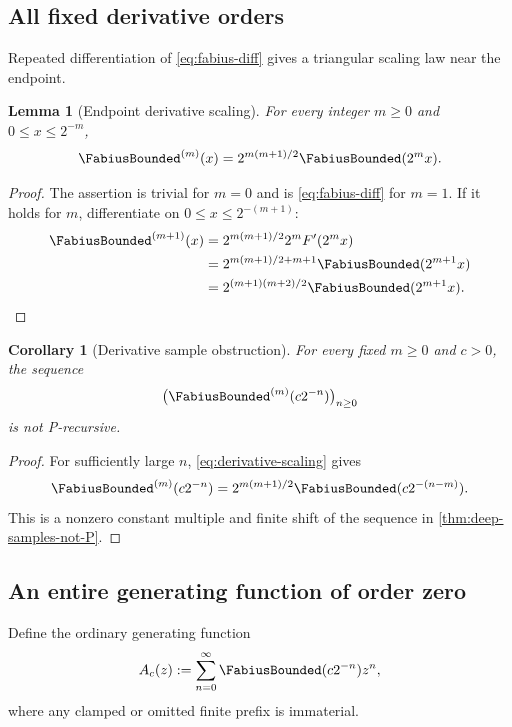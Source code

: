 \documentclass[11pt]{article}
\numberwithin{equation}{section}
\newtheorem{lemma}[theorem]{Lemma}
\newtheorem{corollary}[theorem]{Corollary}
\theoremstyle{definition}
\theoremstyle{remark}
\begin{document}
\subsection{All fixed derivative orders}

Repeated differentiation of \eqref{eq:fabius-diff} gives a triangular scaling
law near the endpoint.

\begin{lemma}[Endpoint derivative scaling]
\label{lem:derivative-scaling}
For every integer $m\ge0$ and $0\le x\le2^{-m}$,
\begin{equation}
 \FabiusBounded^{(m)}(x)=2^{m(m+1)/2}\FabiusBounded(2^mx).
 \label{eq:derivative-scaling}
\end{equation}
\end{lemma}
\begin{proof}
The assertion is trivial for $m=0$ and is \eqref{eq:fabius-diff} for $m=1$.
If it holds for $m$, differentiate on $0\le x\le2^{-(m+1)}$:
\begin{align*}
 \FabiusBounded^{(m+1)}(x)
 &=2^{m(m+1)/2}2^mF'(2^mx)\\
 &=2^{m(m+1)/2+m+1}\FabiusBounded(2^{m+1}x)\\
 &=2^{(m+1)(m+2)/2}\FabiusBounded(2^{m+1}x).
\end{align*}
\end{proof}

\begin{corollary}[Derivative sample obstruction]
\label{cor:derivative-samples-not-P}
For every fixed $m\ge0$ and $c>0$, the sequence
\begin{equation}
 \bigl(\FabiusBounded^{(m)}(c2^{-n})\bigr)_{n\ge0}
 \label{eq:derivative-sample-sequence}
\end{equation}
is not P-recursive.
\end{corollary}
\begin{proof}
For sufficiently large $n$, \eqref{eq:derivative-scaling} gives
\[
 \FabiusBounded^{(m)}(c2^{-n})
 =2^{m(m+1)/2}\FabiusBounded(c2^{-(n-m)}).
\]
This is a nonzero constant multiple and finite shift of the sequence in
\cref{thm:deep-samples-not-P}.
\end{proof}

\subsection{An entire generating function of order zero}

Define the ordinary generating function
\begin{equation}
 A_c(z):=\sum_{n=0}^{\infty}\FabiusBounded(c2^{-n})z^n,
 \label{eq:sample-OGF}
\end{equation}
where any clamped or omitted finite prefix is immaterial.
\end{document}
